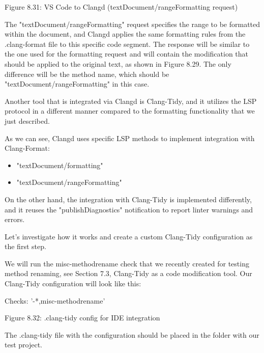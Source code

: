 \begin{center}
Figure 8.31: VS Code to Clangd (textDocument/rangeFormatting request)
\end{center}

The "textDocument/rangeFormatting" request specifies the range to be formatted within the document, and Clangd applies the same formatting rules from the .clang-format file to this specific code segment. The response will be similar to the one used for the formatting request and will contain the modification that should be applied to the original text, as shown in Figure 8.29. The only difference will be the method name, which should be "textDocument/rangeFormatting" in this case.

Another tool that is integrated via Clangd is Clang-Tidy, and it utilizes the LSP protocol in a different manner compared to the formatting functionality that we just described.


As we can see, Clangd uses specific LSP methods to implement integration with Clang-Format:

\begin{itemize}
\item
"textDocument/formatting"

\item
"textDocument/rangeFormatting"
\end{itemize}

On the other hand, the integration with Clang-Tidy is implemented differently, and it reuses the "publishDiagnostics" notification to report linter warnings and errors.

Let's investigate how it works and create a custom Clang-Tidy configuration as the first step.


We will run the misc-methodrename check that we recently created for testing method renaming, see Section 7.3, Clang-Tidy as a code modification tool. Our Clang-Tidy configuration will look like this:

\begin{shell}
Checks: '-*,misc-methodrename'
\end{shell}

\begin{center}
Figure 8.32: .clang-tidy config for IDE integration
\end{center}

The .clang-tidy file with the configuration should be placed in the folder with our test project.

